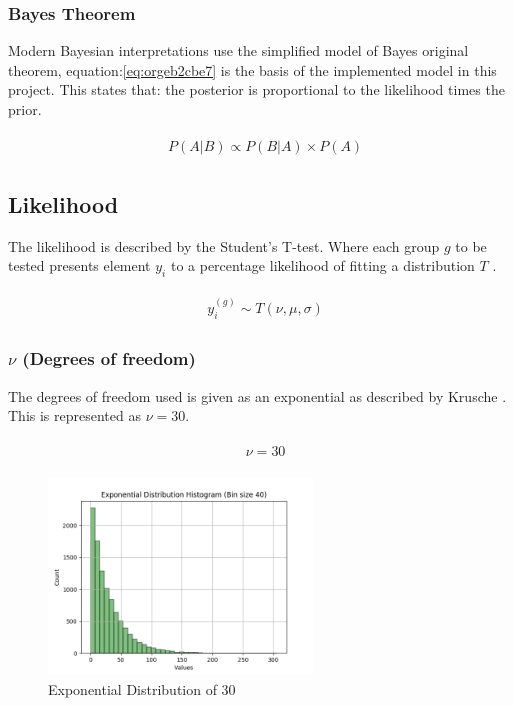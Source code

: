 \documentclass[11pt]{report}
\begin{document}
\subsubsection{Bayes Theorem}
\label{sec:orgf8b981a}

Modern Bayesian interpretations use the simplified model of Bayes original theorem, equation:\ref{eq:orgeb2cbe7} is the basis of the implemented model in this project. This states that: the posterior is proportional to the likelihood times the prior.

\begin{align}
\label{eq:orgeb2cbe7}
  &\begin{aligned}
  P(A|B) \propto P(B|A) \times P(A)
  \end{aligned}
\end{align}


\subsection{Likelihood}
\label{sec:orgde73745}
The likelihood is described by the Student's T-test. Where each group \(g\) to be tested presents element \(y_i\) to a percentage likelihood of fitting a distribution \(T\) .

 \begin{align}
\label{eq:org8678ebd}
   &\begin{aligned}
y_i^{(g)} \sim T(\nu, \mu, \sigma)
   \end{aligned}
 \end{align}

\subsubsection{\(\nu\) (Degrees of freedom)}
\label{sec:org23a8a18}
The degrees of freedom used is given as an exponential as described by
Krusche \cite{Kruschke2012}. This is represented as \(\nu = 30\).

 \begin{align}
\label{eq:org0010944}
   &\begin{aligned}
\nu = 30
   \end{aligned}
 \end{align}

\begin{figure}[htbp]
\centering
\includegraphics[width=7cm]{./images/dist2.png}
\caption{\label{fig:org2e8fcf2}
Exponential Distribution of 30}
\end{figure}
\end{document}
